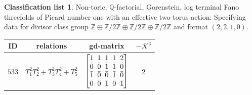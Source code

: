 \documentclass[pdftex]{sigma}%
\theoremstyle{definition}
\newtheorem{class-list}[thm]{Classification list}
\def\ZZ{{\mathbb Z}}
\def\QQ{{\mathbb Q}}
\numberwithin{equation}{section}
\begin{document}
\begin{class-list}\label{class-list(0,2,2,2)}
Non-toric, $\QQ$-factorial, Gorenstein, log terminal Fano
threefolds of Picard number one with an effective two-torus action:
Specifying data for divisor class group
$\ZZ\oplus \ZZ/2\ZZ\oplus \ZZ/2\ZZ\oplus \ZZ/2\ZZ$ and
format $(2,2,1,0)$.
\begin{table}[h!]\centering\setlength{\tabcolsep}{5.5pt}
\renewcommand{\arraystretch}{1.15}\small\tabulinesep=1mm
\begin{tabu}{c|c|c|c}
\hline
ID&relations&gd-matrix&$-\mathcal{K}^3$
\\
\hline
${533}$&${T_{1}^{2}T_{2}^{2}+T_{3}^{2}T_{4}^{2}+T_{5}^{2}}$
&$\arraycolsep=1mm\begin{bmatrix}{1} & {1} & {1} & {1} & {2} \\ {\bar{0}} & {\bar{0}} & {\bar{1}} & {\bar{1}} & {\bar{0}} \\ {\bar{1}} & {\bar{0}} & {\bar{0}} & {\bar{1}} & {\bar{0}} \\ {\bar{0}} & {\bar{0}} & {\bar{1}} & {\bar{0}} & {\bar{1}}\end{bmatrix}$
&${2}$
\\
\hline
\end{tabu}%
\end{table}
\end{class-list}
\end{document}
